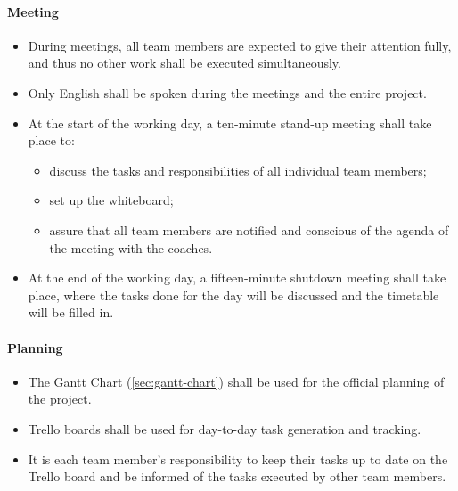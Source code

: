 \paragraph{Meeting}
\begin{itemize}
    \item During meetings, all team members are expected to give their attention fully, and thus no other work shall be executed simultaneously.
    \item Only English shall be spoken during the meetings and the entire project.
    \item At the start of the working day, a ten-minute stand-up meeting shall take place to:
    \begin{itemize}
        \item discuss the tasks and responsibilities of all individual team members;
        \item set up the whiteboard;
        \item assure that all team members are notified and conscious of the agenda of the meeting with the coaches.
    \end{itemize}
    \item At the end of the working day, a fifteen-minute shutdown meeting shall take place, where the tasks done for the day will be discussed and the timetable will be filled in.
\end{itemize}

\paragraph{Planning}
\begin{itemize}
    \item The Gantt Chart (\cref{sec:gantt-chart}) shall be used for the official planning of the project.
    \item Trello boards shall be used for day-to-day task generation and tracking.
    \item It is each team member’s responsibility to keep their tasks up to date on the Trello board and be informed of the tasks executed by other team members.
\end{itemize}


